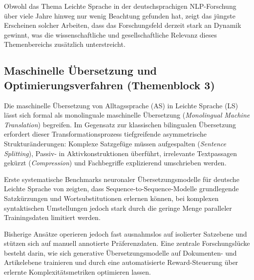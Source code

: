 Obwohl das Thema Leichte Sprache in der deutschsprachigen NLP-Forschung über viele Jahre hinweg nur wenig Beachtung gefunden hat, zeigt das jüngste Erscheinen solcher Arbeiten, dass das Forschungsfeld derzeit stark an Dynamik gewinnt, was die wissenschaftliche und gesellschaftliche Relevanz dieses Themenbereichs zusätzlich unterstreicht.

\subsection{Maschinelle Übersetzung und Optimierungsverfahren (Themenblock 3)}
\label{sec:maschinelle_textvereinfachung_alignment}
\label{sec:maschinelle_uebersetzung_modellierung}
\label{sec:dpo_textgenerierung}

Die maschinelle Übersetzung von Alltagssprache (AS) in Leichte Sprache (LS) lässt sich formal als monolinguale maschinelle Übersetzung (\textit{Monolingual Machine Translation}) begreifen. Im Gegensatz zur klassischen bilingualen Übersetzung erfordert dieser Transformationsprozess tiefgreifende asymmetrische Strukturänderungen: Komplexe Satzgefüge müssen aufgespalten (\textit{Sentence Splitting}), Passiv- in Aktivkonstruktionen überführt, irrelevante Textpassagen gekürzt (\textit{Compression}) und Fachbegriffe explizierend umschrieben werden.

Erste systematische Benchmarks neuronaler Übersetzungsmodelle für deutsche Leichte Sprache von \citet{saeuberli2020benchmarking} zeigten, dass Sequence-to-Sequence-Modelle grundlegende Satzkürzungen und Wortsubstitutionen erlernen können, bei komplexen syntaktischen Umstellungen jedoch stark durch die geringe Menge paralleler Trainingsdaten limitiert werden.

Bisherige Ansätze operieren jedoch fast ausnahmslos auf isolierter Satzebene und stützen sich auf manuell annotierte Präferenzdaten. Eine zentrale Forschungslücke besteht darin, wie sich generative Übersetzungsmodelle auf Dokumenten- und Artikelebene trainieren und durch eine automatisierte Reward-Steuerung über erlernte Komplexitätsmetriken optimieren lassen.

